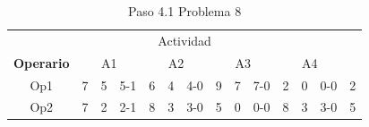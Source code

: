 \documentclass[12pt]{article}  %
\begin{document}
\begin{table}[H]
\centering
\caption{Paso 4.1 Problema 8}
\label{tab:Paso4.1Prob8}
\begin{tabular}{ccclcclcclcclc}
\multicolumn{14}{c}{Actividad}                                                                                                                                                                                                                                                                                                                                                                                                                                                                                                                                                                                                                                                         \\ \cline{2-13}
\multicolumn{1}{c|}{\textbf{Operario}} & \multicolumn{3}{c|}{A1}                                                                                                                            & \multicolumn{3}{c|}{A2}                                                                                                                            & \multicolumn{3}{c|}{A3}                                                                                                                            & \multicolumn{3}{c|}{A4}                                                                                                                            & \multicolumn{1}{l}{}      \\ \cline{2-13}
\multicolumn{1}{c|}{Op1}               & \multicolumn{1}{c|}{\cellcolor[HTML]{67FD9A}7} & \multicolumn{1}{c|}{\cellcolor[HTML]{FFCC67}5} & \multicolumn{1}{l|}{\cellcolor[HTML]{FCFF2F}5-1} & \multicolumn{1}{c|}{\cellcolor[HTML]{67FD9A}6} & \multicolumn{1}{c|}{\cellcolor[HTML]{FFCC67}4} & \multicolumn{1}{l|}{\cellcolor[HTML]{F8FF00}4-0} & \multicolumn{1}{c|}{\cellcolor[HTML]{67FD9A}9} & \multicolumn{1}{c|}{\cellcolor[HTML]{FFCC67}7} & \multicolumn{1}{l|}{\cellcolor[HTML]{F8FF00}7-0} & \multicolumn{1}{c|}{\cellcolor[HTML]{67FD9A}2} & \multicolumn{1}{c|}{\cellcolor[HTML]{FFC702}0} & \multicolumn{1}{l|}{\cellcolor[HTML]{F8FF00}0-0} & \cellcolor[HTML]{FFCCC9}2 \\ \cline{2-13}
\multicolumn{1}{c|}{Op2}               & \multicolumn{1}{c|}{\cellcolor[HTML]{67FD9A}7} & \multicolumn{1}{c|}{\cellcolor[HTML]{FFCC67}2} & \multicolumn{1}{l|}{\cellcolor[HTML]{FCFF2F}2-1} & \multicolumn{1}{c|}{\cellcolor[HTML]{67FD9A}8} & \multicolumn{1}{c|}{\cellcolor[HTML]{FFCC67}3} & \multicolumn{1}{l|}{\cellcolor[HTML]{F8FF00}3-0} & \multicolumn{1}{c|}{\cellcolor[HTML]{67FD9A}5} & \multicolumn{1}{c|}{\cellcolor[HTML]{FFCC67}0} & \multicolumn{1}{l|}{\cellcolor[HTML]{F8FF00}0-0} & \multicolumn{1}{c|}{\cellcolor[HTML]{67FD9A}8} & \multicolumn{1}{c|}{\cellcolor[HTML]{FFC702}3} & \multicolumn{1}{l|}{\cellcolor[HTML]{F8FF00}3-0} & \cellcolor[HTML]{FFCCC9}5 \\ \cline{2-13}

\end{tabular}
\end{table}
\end{document}
